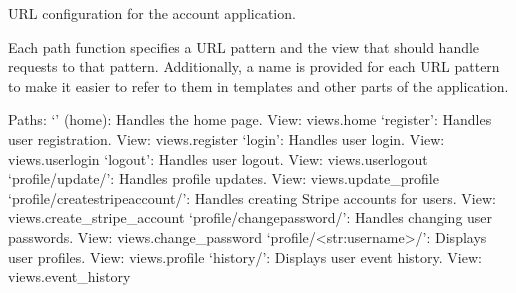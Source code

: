 \documentclass[letterpaper,10pt,english]{sphinxmanual}
\begin{document}
\begin{fulllineitems}
\label{\detokenize{modules/urls:account.urls.urlpatterns}}
\pysigstartsignatures
{}
\pysigstopsignatures
\sphinxAtStartPar
URL configuration for the account application.

\sphinxAtStartPar
Each path function specifies a URL pattern and the view that should handle
requests to that pattern. Additionally, a name is provided for each URL pattern
to make it easier to refer to them in templates and other parts of the application.

\sphinxAtStartPar
Paths:
\sphinxhyphen{} ‘’ (home): Handles the home page. View: views.home
\sphinxhyphen{} ‘register’: Handles user registration. View: views.register
\sphinxhyphen{} ‘login’: Handles user login. View: views.userlogin
\sphinxhyphen{} ‘logout’: Handles user logout. View: views.userlogout
\sphinxhyphen{} ‘profile/update/’: Handles profile updates. View: views.update\_profile
\sphinxhyphen{} ‘profile/create\sphinxhyphen{}stripe\sphinxhyphen{}account/’: Handles creating Stripe accounts for users. View: views.create\_stripe\_account
\sphinxhyphen{} ‘profile/change\sphinxhyphen{}password/’: Handles changing user passwords. View: views.change\_password
\sphinxhyphen{} ‘profile/\textless{}str:username\textgreater{}/’: Displays user profiles. View: views.profile
\sphinxhyphen{} ‘history/’: Displays user event history. View: views.event\_history

\end{fulllineitems}
\end{document}

